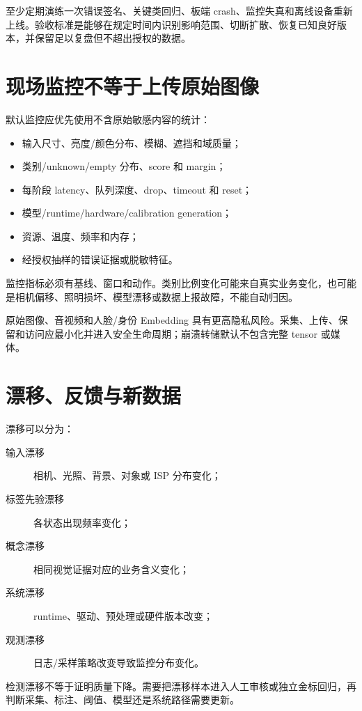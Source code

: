 至少定期演练一次错误签名、关键类回归、板端 crash、监控失真和离线设备重新上线。验收标准是能够在规定时间内识别影响范围、切断扩散、恢复已知良好版本，并保留足以复盘但不超出授权的数据。

\section{现场监控不等于上传原始图像}

默认监控应优先使用不含原始敏感内容的统计：

\begin{itemize}
  \item 输入尺寸、亮度/颜色分布、模糊、遮挡和域质量；
  \item 类别/unknown/empty 分布、score 和 margin；
  \item 每阶段 latency、队列深度、drop、timeout 和 reset；
  \item 模型/runtime/hardware/calibration generation；
  \item 资源、温度、频率和内存；
  \item 经授权抽样的错误证据或脱敏特征。
\end{itemize}

监控指标必须有基线、窗口和动作。类别比例变化可能来自真实业务变化，也可能是相机偏移、照明损坏、模型漂移或数据上报故障，不能自动归因。

原始图像、音视频和人脸/身份 Embedding 具有更高隐私风险。采集、上传、保留和访问应最小化并进入安全生命周期；崩溃转储默认不包含完整 tensor 或媒体。

\section{漂移、反馈与新数据}

漂移可以分为：

\begin{description}
  \item[输入漂移] 相机、光照、背景、对象或 ISP 分布变化；
  \item[标签先验漂移] 各状态出现频率变化；
  \item[概念漂移] 相同视觉证据对应的业务含义变化；
  \item[系统漂移] runtime、驱动、预处理或硬件版本改变；
  \item[观测漂移] 日志/采样策略改变导致监控分布变化。
\end{description}

检测漂移不等于证明质量下降。需要把漂移样本进入人工审核或独立金标回归，再判断采集、标注、阈值、模型还是系统路径需要更新。

